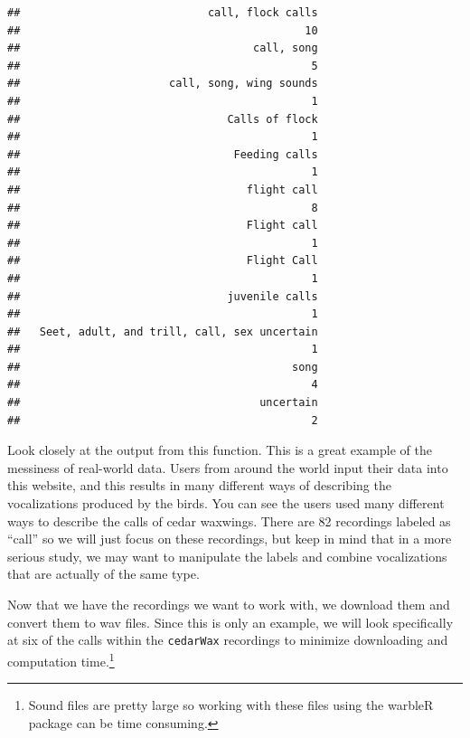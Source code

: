 \documentclass[
]{krantz}
\newenvironment{Shaded}{\begin{snugshade}}{\end{snugshade}}
\newcommand{\DataTypeTok}[1]{\textcolor[rgb]{0.13,0.29,0.53}{#1}}
\newcommand{\DecValTok}[1]{\textcolor[rgb]{0.00,0.00,0.81}{#1}}
\newcommand{\KeywordTok}[1]{\textcolor[rgb]{0.13,0.29,0.53}{\textbf{#1}}}
\newcommand{\NormalTok}[1]{#1}
\newcommand{\OperatorTok}[1]{\textcolor[rgb]{0.81,0.36,0.00}{\textbf{#1}}}
\newcommand{\StringTok}[1]{\textcolor[rgb]{0.31,0.60,0.02}{#1}}
\begin{document}
\begin{verbatim}
##                             call, flock calls 
##                                            10 
##                                    call, song 
##                                             5 
##                       call, song, wing sounds 
##                                             1 
##                                Calls of flock 
##                                             1 
##                                 Feeding calls 
##                                             1 
##                                   flight call 
##                                             8 
##                                   Flight call 
##                                             1 
##                                   Flight Call 
##                                             1 
##                                juvenile calls 
##                                             1 
##   Seet, adult, and trill, call, sex uncertain 
##                                             1 
##                                          song 
##                                             4 
##                                     uncertain 
##                                             2
\end{verbatim}

Look closely at the output from this function. This is a great example of the messiness of real-world data. Users from around the world input their data into this website, and this results in many different ways of describing the vocalizations produced by the birds. You can see the users used many different ways to describe the calls of cedar waxwings. There are 82 recordings labeled as ``call'' so we will just focus on these recordings, but keep in mind that in a more serious study, we may want to manipulate the labels and combine vocalizations that are actually of the same type.

Now that we have the recordings we want to work with, we download them and convert them to wav files. Since this is only an example, we will look specifically at six of the calls within the \texttt{cedarWax} recordings to minimize downloading and computation time.\footnote{Sound files are pretty large so working with these files using the warbleR package can be time consuming.}

\begin{Shaded}
\end{Shaded}
\end{document}
